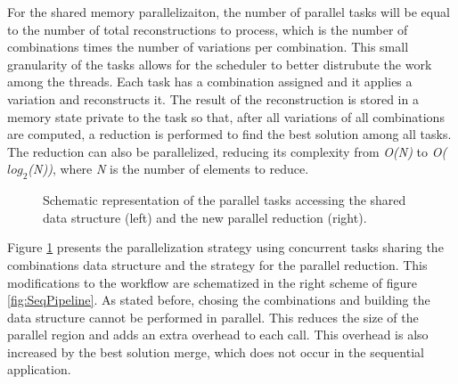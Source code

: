 For the shared memory parallelizaiton, the number of parallel tasks will be equal to the number of total reconstructions to process, which is the number of combinations times the number of variations per combination. This small granularity of the tasks allows for the scheduler to better distrubute the work among the threads. Each task has a combination assigned and it applies a variation and reconstructs it. The result of the reconstruction is stored in a memory state private to the task so that, after all variations of all combinations are computed, a reduction is performed to find the best solution among all tasks. The reduction can also be parallelized, reducing its complexity from \textit{O(N)} to \textit{O($log_{2}$(N))}, where \textit{N} is the number of elements to reduce.

\begin{figure}[!htp]
	\begin{center}
		\caption{Schematic representation of the parallel tasks accessing the shared data structure (left) and the new parallel reduction (right).}
		\label{fig:ParallelMethodology}
	\end{center}
\end{figure}

Figure \ref{fig:ParallelMethodology} presents the parallelization strategy using concurrent tasks sharing the combinations data structure and the strategy for the parallel reduction. This modifications to the workflow are schematized in the right scheme of figure \ref{fig:SeqPipeline}. As stated before, chosing the combinations and building the data structure cannot be performed in parallel. This reduces the size of the parallel region and adds an extra overhead to each \ttDilepKinFit call. This overhead is also increased by the best solution merge, which does not occur in the sequential application.


